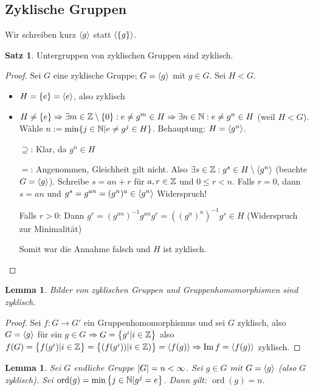 \documentclass[12pt,a4paper]{article}
\newcounter{thmcounter}[subsection]
\theoremstyle{definition}
\theoremstyle{remark}
\theoremstyle{definition}
\newtheorem{satz}[thmcounter]{Satz}
\theoremstyle{definition}
\theoremstyle{plain}
\theoremstyle{plain}
\newtheorem{lem}[thmcounter]{Lemma}
\DeclarePairedDelimiter{\abs}{\lvert}{\rvert}
\DeclareMathOperator{\ord}{ord}
\DeclareMathOperator{\im}{Im}
\begin{document}
\subsection{Zyklische Gruppen}
Wir schreiben kurz $\langle g\rangle$ statt $\langle\{g\}\rangle$.
\begin{satz}
	Untergruppen von zyklischen Gruppen sind zyklisch.
\end{satz}

\begin{proof}
	Sei $G$ eine zyklische Gruppe; $G = \langle g\rangle$ mit $g\in G$. Sei $H<G$.\begin{itemize}
		\item[Fall 1] $H = \{e\} = \langle e\rangle$, also zyklisch
		\item[Fall 2] $H\neq \{e\}\Rightarrow \exists m\in \mathbb Z\setminus\{0\}: e\neq g^m\in H\Rightarrow \exists n\in \mathbb N: e\neq g^n\in H$ (weil $H<G$). Wähle $n := \min\{j\in \mathbb N|e\neq g^j\in H\}$. Behauptung: $H = \langle g^n\rangle$.
		
		\glqq$\supseteq$\grqq: Klar, da $g^n\in H$
		
		\glqq$=$\grqq: Angenommen, Gleichheit gilt nicht. Also $\exists s\in \mathbb Z: g^s\in H\setminus\langle g^n\rangle$ (beachte $G = \langle g\rangle$). Schreibe $s = an+r$ für $a,r\in \mathbb Z$ und $0\leq r<n$. Falls $r = 0$, dann $s = an$ und $g^s = g^{an} = (g^n)^a\in \langle g^n\rangle$ Widerspruch!
		
		Falls $r>0$: Dann $g^r = (g^{an})^{-1}g^{an}g^r = ((g^n)^a)^{-1}g^s\in H$ (Widerspruch zur Minimalität)
		
		Somit war die Annahme falsch und $H$ ist zyklisch.
	\end{itemize}
\end{proof}

\begin{lem}
	Bilder von zyklischen Gruppen und Gruppenhomomorphismen sind zyklisch.
\end{lem}

\begin{proof}
	Sei $f: G \rightarrow G'$ ein Gruppenhomomorphismus und sei $G$ zyklisch, also $G = \langle g\rangle$ für ein $g \in G$ $\Rightarrow G = \left\lbrace g^i | i \in \mathbb Z \right\rbrace$ also $f(G) = \left\lbrace f(g^i) | i\in \IZ \right\rbrace = \left\lbrace (f(g^i)) | i \in \IZ)\right\rbrace = \<f(g)\> \Rightarrow \im f = \<f(g)\>$ zyklisch.
\end{proof}

\begin{lem} \label{lem:ord}
	Sei $G$ endliche Gruppe $\abs G = n < \infty$. Sei $g \in G$ mit $G=\langle g\rangle$ (also $G$ zyklisch).
	Sei $\ord(g) = \min \left\lbrace j \in \IN | g^j = e\right\rbrace $.
	Dann gilt: $\ord(g) = n$. 
\end{lem}
\end{document}
